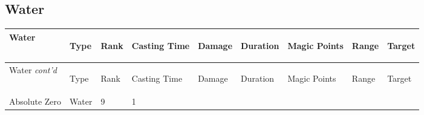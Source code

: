 \documentclass[twoside]{book}
\begin{document}
    

\subsection{Water}
    
\begin{longtable}{p{1.25in}lp{2em}p{3em}llp{7em}ll} 
  Water& \begin{turn}{70}{Type}\end{turn}
          & \begin{turn}{70}{Rank}\end{turn}
          & \begin{turn}{70}{Casting Time}\end{turn}
          & \begin{turn}{70}{Damage}\end{turn}
          & \begin{turn}{70}{Duration}\end{turn}
          & \begin{turn}{70}{Magic Points}\end{turn}
          & \begin{turn}{70}{Range}\end{turn}
          & \begin{turn}{70}{Target}\end{turn}
          \\
  \hline
  \hline
  \endfirsthead
  Water \textit{cont'd}
        & \begin{turn}{70}{Type}\end{turn}
          & \begin{turn}{70}{Rank}\end{turn}
          & \begin{turn}{70}{Casting Time}\end{turn}
          & \begin{turn}{70}{Damage}\end{turn}
          & \begin{turn}{70}{Duration}\end{turn}
          & \begin{turn}{70}{Magic Points}\end{turn}
          & \begin{turn}{70}{Range}\end{turn}
          & \begin{turn}{70}{Target}\end{turn}
           \\
  \hline
  \endhead
\raggedright Absolute Zero & Water & 9 & 1

\end{longtable}
\end{document}
